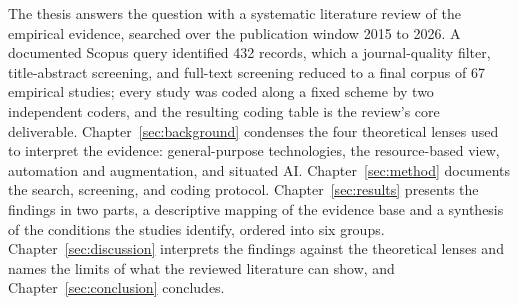 The thesis answers the question with a systematic literature review of the empirical
evidence, searched over the publication window 2015 to 2026. A documented Scopus query identified 432
records, which a journal-quality filter, title-abstract screening, and full-text
screening reduced to a final corpus of 67 empirical studies; every study was coded
along a fixed scheme by two independent coders, and the resulting coding table is the
review's core deliverable. Chapter~\ref{sec:background} condenses the four theoretical
lenses used to interpret the evidence: general-purpose technologies, the resource-based
view, automation and augmentation, and situated AI. Chapter~\ref{sec:method} documents
the search, screening, and coding protocol. Chapter~\ref{sec:results} presents the
findings in two parts, a descriptive mapping of the evidence base and a synthesis of
the conditions the studies identify, ordered into six groups.
Chapter~\ref{sec:discussion} interprets the findings against the theoretical lenses and
names the limits of what the reviewed literature can show, and
Chapter~\ref{sec:conclusion} concludes.
